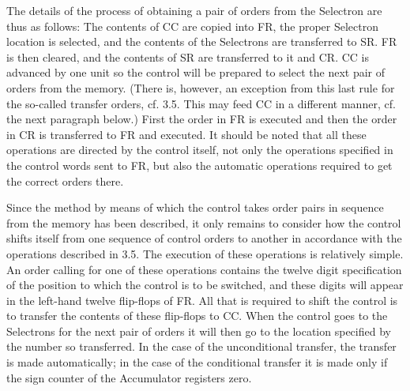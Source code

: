 \documentclass[12pt]{amsart}
\begin{document}
The details of the process of obtaining a pair of orders from the Selectron are thus as follows: The contents of CC are copied into FR, the proper Selectron location is selected, and the contents of the Selectrons are transferred to SR. FR is then cleared, and the contents of SR are transferred to it and CR. CC is advanced by one unit so the control will be prepared to select the next pair of orders from the memory. (There is, however, an exception from this last rule for the so-called transfer orders, cf. 3.5. This may feed CC in a different manner, cf. the next paragraph below.) First the order in FR is executed and then the order in CR is transferred to FR and executed. It should be noted that all these operations are directed by the control itself, not only the operations specified in the control words sent to FR, but also the automatic operations required to get the correct orders there.

Since the method by means of which the control takes order pairs in sequence from the memory has been described, it only remains to consider how the control shifts itself from one sequence of control orders to another in accordance with the operations described in 3.5. The execution of these operations is relatively simple. An order calling for one of these operations contains the twelve digit specification of the position to which the control is to be switched, and these digits will appear in the left-hand twelve flip-flops of FR. All that is required to shift the control is to transfer the contents of these flip-flops to CC. When the control goes to the Selectrons for the next pair of orders it will then go to the location specified by the number so transferred. In the case of the unconditional transfer, the transfer is made automatically; in the case of the conditional transfer it is made only if the sign counter of the Accumulator registers zero.
\end{document}
